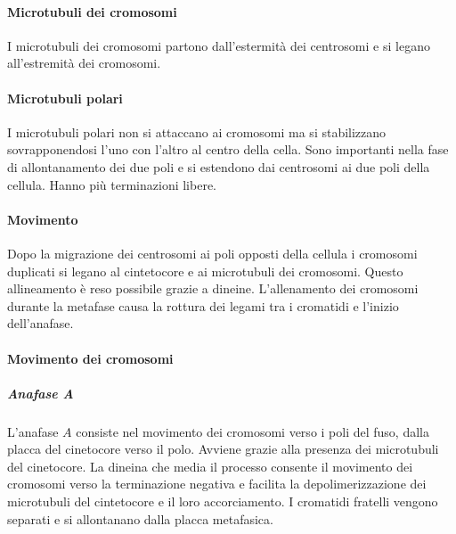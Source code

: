 			\paragraph{Microtubuli dei cromosomi}
			I microtubuli dei cromosomi partono dall'estermit\`a dei centrosomi e si legano all'estremit\`a dei cromosomi.

			\paragraph{Microtubuli polari}
			I microtubuli polari non si attaccano ai cromosomi ma si stabilizzano sovrapponendosi l'uno con l'altro al centro della cella.
			Sono importanti nella fase di allontanamento dei due poli e si estendono dai centrosomi ai due poli della cellula.
			Hanno pi\`u terminazioni libere.

			\paragraph{Movimento}
			Dopo la migrazione dei centrosomi ai poli opposti della cellula i cromosomi duplicati si legano al cintetocore e ai microtubuli dei cromosomi.
			Questo allineamento \`e reso possibile grazie a dineine.
			L'allenamento dei cromosomi durante la metafase causa la rottura dei legami tra i cromatidi e l'inizio dell'anafase.

			\paragraph{Movimento dei cromosomi}

				\subparagraph{Anafase \emph{A}}
				L'anafase $A$ consiste nel movimento dei cromosomi verso i poli del fuso, dalla placca del cinetocore verso il polo.
				Avviene grazie alla presenza dei microtubuli del cinetocore.
				La dineina che media il processo consente il movimento dei cromosomi verso la terminazione negativa e facilita la depolimerizzazione dei microtubuli del cintetocore e il loro accorciamento.
				I cromatidi fratelli vengono separati e si allontanano dalla placca metafasica.

